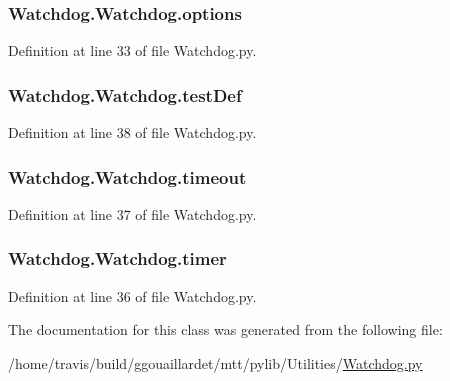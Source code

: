 \hypertarget{classWatchdog_1_1Watchdog_a5ceb06fde29b89623d7a230ae080abe6}{
\subsubsection[{options}]{\setlength{\rightskip}{0pt plus 5cm}Watchdog.\-Watchdog.\-options}}\label{classWatchdog_1_1Watchdog_a5ceb06fde29b89623d7a230ae080abe6}


Definition at line 33 of file Watchdog.\-py.

\hypertarget{classWatchdog_1_1Watchdog_abc547688f9ff2ab9350b028c6f122997}{
\subsubsection[{test\-Def}]{\setlength{\rightskip}{0pt plus 5cm}Watchdog.\-Watchdog.\-test\-Def}}\label{classWatchdog_1_1Watchdog_abc547688f9ff2ab9350b028c6f122997}


Definition at line 38 of file Watchdog.\-py.

\hypertarget{classWatchdog_1_1Watchdog_a62dc7dad113fcda93fe4f8855ac037db}{
\subsubsection[{timeout}]{\setlength{\rightskip}{0pt plus 5cm}Watchdog.\-Watchdog.\-timeout}}\label{classWatchdog_1_1Watchdog_a62dc7dad113fcda93fe4f8855ac037db}


Definition at line 37 of file Watchdog.\-py.

\hypertarget{classWatchdog_1_1Watchdog_ae03efeba550ed8039ab79a8414b8be82}{
\subsubsection[{timer}]{\setlength{\rightskip}{0pt plus 5cm}Watchdog.\-Watchdog.\-timer}}\label{classWatchdog_1_1Watchdog_ae03efeba550ed8039ab79a8414b8be82}


Definition at line 36 of file Watchdog.\-py.



The documentation for this class was generated from the following file\-:\begin{DoxyCompactItemize}
\item 
/home/travis/build/ggouaillardet/mtt/pylib/\-Utilities/\hyperlink{Watchdog_8py}{Watchdog.\-py}\end{DoxyCompactItemize}
